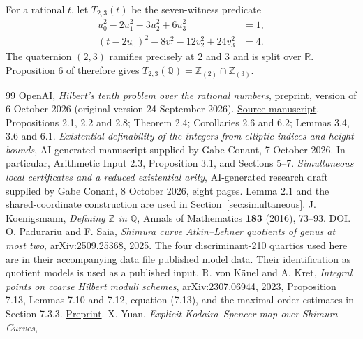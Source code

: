 \documentclass[11pt]{article}
\theoremstyle{definition}
\newcommand{\Q}{\mathbb Q}\newcommand{\Z}{\mathbb Z}
\begin{document}
For a rational \(t\), let \(T_{2,3}(t)\) be the seven-witness
predicate
\begin{equation}\label{eq:T23}
\begin{split}
 u_0^2-2u_1^2-3u_2^2+6u_3^2&=1,\\
 (t-2u_0)^2-8v_1^2-12v_2^2+24v_3^2&=4.
\end{split}
\end{equation}
The quaternion \((2,3)\) ramifies precisely at 2 and 3 and is
split over \(\mathbb R\). Proposition 6 of \cite{Koenigsmann}
therefore gives
\(T_{2,3}(\Q)=\Z_{(2)}\cap\Z_{(3)}\).


\begin{thebibliography}{99}\footnotesize\setlength{\itemsep}{2pt}
 OpenAI, \emph{Hilbert's tenth problem over the rational
numbers}, preprint, version of 6 October 2026 (original version
24 September 2026).
\href{https://github.com/openai/math/blob/main/preprints/Hilberts-tenth-problem-over-the-rational-numbers-October-6-2026/main.pdf}{Source manuscript}.
Propositions 2.1, 2.2 and 2.8; Theorem 2.4; Corollaries 2.6 and 6.2;
Lemmas 3.4, 3.6 and 6.1. 
 \emph{Existential definability of the integers from
elliptic indices and height bounds}, AI-generated manuscript supplied
by Gabe Conant, 7 October 2026. In particular, Arithmetic Input 2.3,
Proposition 3.1, and Sections 5--7.
 \emph{Simultaneous local certificates and a
reduced existential arity}, AI-generated research draft supplied by
Gabe Conant, 8 October 2026, eight pages. Lemma 2.1 and the shared-coordinate construction are used
in Section~\ref{sec:simultaneous}.
 J. Koenigsmann, \emph{Defining $\Z$ in $\Q$},
Annals of Mathematics \textbf{183} (2016), 73--93.
\href{https://doi.org/10.4007/annals.2016.183.1.2}{DOI}.
 O. Padurariu and F. Saia,
\emph{Shimura curve Atkin--Lehner quotients of genus at most two},
arXiv:2509.25368, 2025. The four discriminant-210 quartics used here are
in their accompanying data file
\href{https://github.com/fsaia/GenusAtMost2/blob/main/non_elliptic_genus_1_equation_determined_final.m}{published model data}.
Their identification as quotient models is used as a published input.
 R. von K\"anel and A. Kret,
\emph{Integral points on coarse Hilbert moduli schemes},
arXiv:2307.06944, 2023, Proposition 7.13, Lemmas 7.10 and 7.12,
equation (7.13), and the maximal-order estimates in Section 7.3.3.
\href{https://arxiv.org/abs/2307.06944}{Preprint}.
 X. Yuan,
\emph{Explicit Kodaira--Spencer map over Shimura Curves},

\end{thebibliography}
\end{document}
